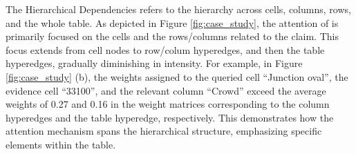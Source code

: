 {The Hierarchical Dependencies refers to the hierarchy across cells, columns, rows, and the whole table. As depicted in Figure \ref{fig:case_study}, the attention of \name is primarily focused on the cells and the rows/columns related to the claim. This focus extends from cell nodes to row/colum hyperedges, and then the table hyperedges, gradually diminishing in intensity. For example, in Figure \ref{fig:case_study} (b), the weights assigned to the queried cell ``Junction oval'', the evidence cell ``33100'', and the relevant column ``Crowd'' exceed the average weights of 0.27 and 0.16 in the weight matrices corresponding to the column hyperedges and the table hyperedge, respectively. This demonstrates how the attention mechanism spans the hierarchical structure, emphasizing specific elements within the table.



}
